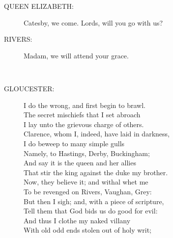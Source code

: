 \documentclass{article}
\begin{document}
\begin{description}
\item[QUEEN ELIZABETH:] 
\hspace{1pt}Catesby, we come. Lords, will you go with us?\\
\end{description}
\begin{description}
\item[RIVERS:] 
\hspace{1pt}Madam, we will attend your grace.\\
\end{description}
\\
\begin{description}
\item[GLOUCESTER:] 
\hspace{1pt}I do the wrong, and first begin to brawl.\\
\hspace{1pt}The secret mischiefs that I set abroach\\
\hspace{1pt}I lay unto the grievous charge of others.\\
\hspace{1pt}Clarence, whom I, indeed, have laid in darkness,\\
\hspace{1pt}I do beweep to many simple gulls\\
\hspace{1pt}Namely, to Hastings, Derby, Buckingham;\\
\hspace{1pt}And say it is the queen and her allies\\
\hspace{1pt}That stir the king against the duke my brother.\\
\hspace{1pt}Now, they believe it; and withal whet me\\
\hspace{1pt}To be revenged on Rivers, Vaughan, Grey:\\
\hspace{1pt}But then I sigh; and, with a piece of scripture,\\
\hspace{1pt}Tell them that God bids us do good for evil:\\
\hspace{1pt}And thus I clothe my naked villany\\
\hspace{1pt}With old odd ends stolen out of holy writ;\\

\end{description}
\end{document}
